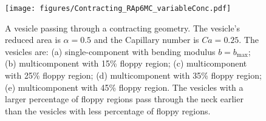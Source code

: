 \documentclass[twoside,twocolumn,9pt]{article}
\newcommand{\subfigimg}[3][,]{%
  \setbox1=\hbox{\texttt{[image: \#3]}}%
  \leavevmode\rlap{\usebox1}%
  \rlap{\hspace*{0pt}\raisebox{\dimexpr\ht1-0\baselineskip}{\bf
  \normalsize #2}}%
  \phantom{\usebox1}%
}
\begin{document}
\begin{figure}[h]
  \centering
  \texttt{[image: figures/Contracting\_RAp6MC\_variableConc.pdf]}
  \caption{\label{fig:RA5} \small A vesicle passing through a
  contracting geometry. The vesicle's reduced area is $\alpha = 0.5$ and
  the Capillary number is $Ca = 0.25$. The vesicles are: (a)
  single-component with bending modulus $b=b_{\max}$; (b) multicomponent
  with 15\% floppy region; (c) multicomponent with 25\% floppy region;
  (d) multicomponent with 35\% floppy region; (e) multicomponent with
  45\% floppy region. The vesicles with a larger percentage of floppy
  regions pass through the neck earlier than the vesicles with less
  percentage of floppy regions.}
\end{figure}
\end{document}

